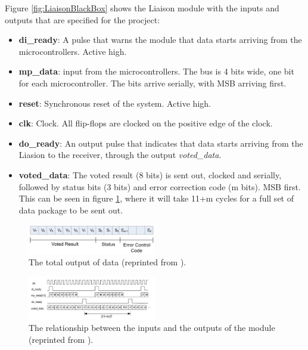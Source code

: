 \documentclass[a4paper]{IEEEtran}
\begin{document}
Figure \ref{fig:LiaisonBlackBox} shows the Liaison module with the inputs and outputs that are specified for the procject:
\begin{itemize}
    \item \textbf{di\_ready}: A pulse that warns the module that data starts arriving from the microcontrollers. Active high.
    \item \textbf{mp\_data}: input from the microcontrollers. The bus is 4 bits wide, one bit for each microcontroller. The bits arrive serially, with MSB arriving first.
    \item \textbf{reset}: Synchronous reset of the system. Active high.
    \item \textbf{clk}: Clock. All flip-flops are clocked on the positive edge of the clock.
    \item \textbf{do\_ready}: An output pulse that indicates that data starts arriving from the Liasion to the receiver, through the output \textit{voted\_data}.
    \item  \textbf{voted\_data}: The voted result (8 bits) is sent out, clocked and serially, followed by status bits (3 bits) and error correction code (m bits).
        MSB first.
        This can be seen in figure \ref{fig:LiaisonOutput}, where it will take 11+m cycles for a full set of data package to be sent out.
\end{itemize}

\begin{figure}[h!]
    \centering
    \includegraphics[width=0.5\textwidth]{Figures/ProjectDescription/LiaisonOutput}
    \caption{The total output of data (reprinted from \protect\cite{assignment-text}).}
    \label{fig:LiaisonOutput}
\end{figure}

\begin{figure}[h!]
    \centering
    \includegraphics[width=0.5\textwidth]{Figures/ProjectDescription/LiaisonInputOutput}
    \caption{The relationship between the inputs and the outputs of the module (reprinted from \protect\cite{assignment-text}).}
    \label{fig:LiaisonInputOutput}
\end{figure}
\end{document}
